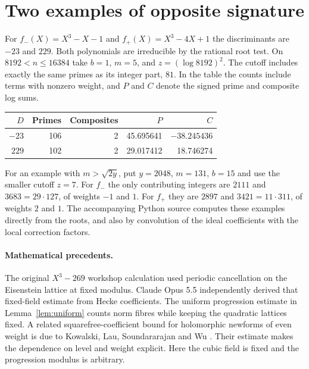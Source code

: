 \documentclass[11pt,a4paper]{article}
\begin{document}
\newpage
\section{Two examples of opposite signature}
For $f_-(X)=X^3-X-1$ and $f_+(X)=X^3-4X+1$ the discriminants
are $-23$ and $229$. Both polynomials are irreducible by the rational
root test. On $8192<n\le16384$ take $b=1$, $m=5$, and
$z=(\log 8192)^2$. The cutoff includes exactly the same primes as its
integer part, $81$. In the table the counts include terms with nonzero
weight, and $P$ and $C$ denote the signed prime and composite log sums.
\begin{center}
\begin{tabular}{rrrrr}
\toprule
$D$&Primes&Composites&$P$&$C$\\
\midrule
$-23$&106&2&45.695641&$-38.245436$\\
$229$&102&2&29.017412&18.746274\\
\bottomrule
\end{tabular}
\end{center}
For an example with $m>\sqrt{2y}$, put $y=2048$, $m=131$, $b=15$ and
use the smaller cutoff $z=7$. For $f_-$ the only contributing
integers are $2111$ and $3683=29\cdot127$, of weights $-1$ and $1$.
For $f_+$ they are $2897$ and $3421=11\cdot311$, of weights $2$ and $1$.
The accompanying Python source computes these examples directly from
the roots, and also by convolution of the ideal coefficients with the
local correction factors.

\paragraph{Mathematical precedents.}
The original $X^3-269$ workshop calculation used periodic
cancellation on the Eisenstein lattice at fixed modulus. Claude
Opus 5.5 independently derived that fixed-field estimate from
Hecke coefficients. The uniform progression estimate in
Lemma~\ref{lem:uniform} counts norm fibres while keeping the quadratic
lattices fixed. A related squarefree-coefficient bound for holomorphic
newforms of even weight is due to Kowalski, Lau, Soundararajan and Wu
\cite[\S2, (2.1)]{klsw}. Their estimate makes the dependence on level
and weight explicit. Here the cubic field is fixed and the progression
modulus is arbitrary.
\end{document}
